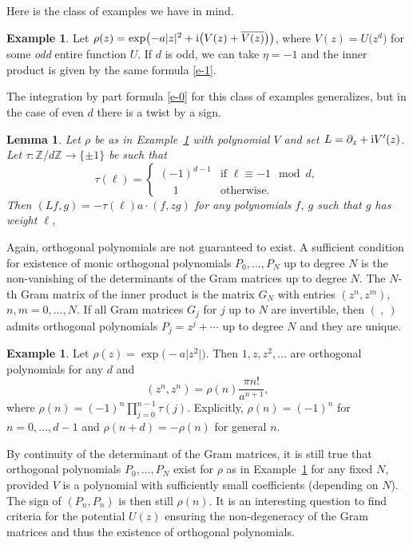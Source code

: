 \documentclass[pdftex]{sigma}
\numberwithin{equation}{section}
\newtheorem{Lemma}[Theorem]{Lemma}
\theoremstyle{definition}
\newtheorem{Example}[Theorem]{Example}
\begin{document}
Here is the class of examples we have in mind.

\begin{Example}\label{ex-1}
 Let $\rho(z)=\exp\bigl(-a|z|^2+{\rm i}\bigl(V(z)+\overline {V(z)}\bigr)\bigr)$, where $V(z)=U\bigl(z^d\bigr)$ for some {\em odd} entire function $U$. If $d$ is odd, we can take $\eta =-1$ and the inner product is given by the same formula \eqref{e-1}.
\end{Example}
The integration by part formula \eqref{e-0} for this class of examples generalizes, but in the case of even $d$ there is a twist by a sign.

\begin{Lemma}
 Let $\rho$ be as in Example~{\rm\ref{ex-1}} with polynomial $V$ and set $L=\partial_z + {\rm i}V'(z)$.
 Let $\tau\colon\mathbb Z/d\mathbb Z\to\{\pm1\}$ be such that
 \[
 \tau(\ell)=\begin{cases}
 (-1)^{d-1}& \text{if $\ell\equiv -1\mod{d}$},
 \\
 \phantom{-}1& \text{otherwise.}
 \end{cases}
 \]
 Then
 $ (Lf,g)=-\tau(\ell)a\cdot(f,zg)$ for any polynomials $f$, $g$ such that $g$ has weight $\ell$,
\end{Lemma}
Again, orthogonal polynomials are not guaranteed to exist. A sufficient condition for existence of monic orthogonal polynomials $P_0,\dots, P_N$ up to degree $N$ is the non-vanishing of the determinants of the Gram matrices up to degree $N$. The $N$-th Gram matrix of the inner product is the matrix $G_N$ with entries $(z^n,z^m)$, $n,m=0,\dots, N$. If all Gram matrices $G_j$ for $j$ up to $N$ are invertible, then $(\ ,\ )$ admits orthogonal polynomials $P_j=z^j+\cdots$ up to degree $N$ and they are unique.

\begin{Example}\label{ex-2}
 Let $\rho(z)=\exp\bigl(-a\big|z^2\big|\bigr)$. Then $1,z,z^2,\dots$ are orthogonal polynomials for any $d$ and
 \[
 (z^n,z^n)=\rho(n)\frac{\pi n!}{a^{n+1}},
 \]
 where $\rho(n)=(-1)^n\prod_{j=0}^{n-1}\tau(j)$. Explicitly, $\rho(n)=(-1)^n$ for $n=0,\dots,d-1$ and $\rho(n+d)=-\rho(n)$ for general $n$.
\end{Example}
By continuity of the determinant of the Gram matrices, it is still true that orthogonal polynomials $P_0,\dots, P_N$ exist for $\rho$ as in Example~\ref{ex-1} for any fixed $N$, provided $V$ is a polynomial with sufficiently small coefficients (depending on $N$). The sign of $(P_n,P_n)$ is then still $\rho(n)$. It is an interesting question to find criteria for the potential $U(z)$ ensuring the non-degeneracy of the Gram matrices and thus the existence of orthogonal polynomials.
\end{document}
